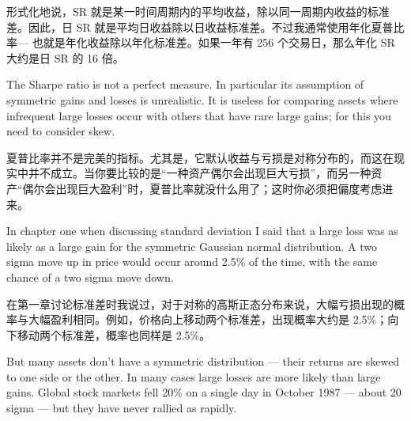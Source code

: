 \begin{chineseblock}形式化地说，SR 就是某一时间周期内的平均收益，除以同一周期内收益的标准差。因此，日 SR 就是平均日收益除以日收益标准差。不过我通常使用年化夏普比率--- 也就是年化收益除以年化标准差。如果一年有 256 个交易日，那么年化 SR 大约是日 SR 的 16 倍。\end{chineseblock}

\bipairgap

\begin{englishblock} The Sharpe ratio is not a perfect measure. In particular its assumption of symmetric gains and losses is unrealistic. It is useless for comparing assets where infrequent large losses occur with others that have rare large gains; for this you need to consider skew. \end{englishblock}

\begin{chineseblock}夏普比率并不是完美的指标。尤其是，它默认收益与亏损是对称分布的，而这在现实中并不成立。当你要比较的是“一种资产偶尔会出现巨大亏损”，而另一种资产“偶尔会出现巨大盈利”时，夏普比率就没什么用了；这时你必须把偏度考虑进来。\end{chineseblock}


\begin{englishblock} In chapter one when discussing standard deviation I said that a large loss was as likely as a large gain for the symmetric Gaussian normal distribution. A two sigma move up in price would occur around 2.5\% of the time, with the same chance of a two sigma move down. \end{englishblock}

\begin{chineseblock}在第一章讨论标准差时我说过，对于对称的高斯正态分布来说，大幅亏损出现的概率与大幅盈利相同。例如，价格向上移动两个标准差，出现概率大约是 2.5\%；向下移动两个标准差，概率也同样是 2.5\%。 \end{chineseblock}

\bipairgap

\begin{englishblock} But many assets don't have a symmetric distribution --- their returns are skewed to one side or the other. In many cases large losses are more likely than large gains. Global stock markets fell 20\% on a single day in October 1987 --- about 20 sigma --- but they have never rallied as rapidly. \end{englishblock}

